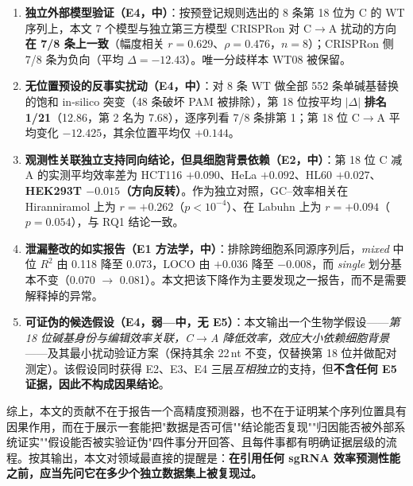\begin{enumerate}
\item \textbf{独立外部模型验证（E4，中）}：按预登记规则选出的 8 条第 18 位为 C 的 WT 序列上，本文 7 个模型与独立第三方模型 CRISPRon 对 C$\rightarrow$A 扰动的方向\textbf{在 7/8 条上一致}（幅度相关 $r=0.629$、$\rho=0.476$，$n=8$）；CRISPRon 侧 7/8 条为负向（平均 $\Delta=-12.43$）。唯一分歧样本 WT08 被保留。
\item \textbf{无位置预设的反事实扰动（E4，中）}：对 8 条 WT 做全部 552 条单碱基替换的饱和 in-silico 突变（48 条破坏 PAM 被排除），第 18 位按平均 $|\Delta|$ \textbf{排名 1/21}（12.86，第 2 名为 7.68），逐序列看 7/8 条排第 1；第 18 位 C$\rightarrow$A 平均变化 $-12.425$，其余位置平均仅 $+0.144$。
\item \textbf{观测性关联独立支持同向结论，但具细胞背景依赖（E2，中）}：第 18 位 C 减 A 的实测平均效率差为 HCT116 $+0.090$、HeLa $+0.092$、HL60 $+0.027$、\textbf{HEK293T $-0.015$（方向反转）}。作为独立对照，GC–效率相关在 Hiranniramol 上为 $r=+0.262$（$p<10^{-4}$）、在 Labuhn 上为 $r=+0.094$（$p=0.054$），与 RQ1 结论一致。
\item \textbf{泄漏整改的如实报告（E1 方法学，中）}：排除跨细胞系同源序列后，\emph{mixed} 中位 $R^{2}$ 由 0.118 降至 0.073，LOCO 由 $+0.036$ 降至 $-0.008$，而 \emph{single} 划分基本不变（0.070 $\rightarrow$ 0.081）。本文把该下降作为主要发现之一报告，而不是需要解释掉的异常。
\item \textbf{可证伪的候选假设（E4，弱—中，无 E5）}：本文输出一个生物学假设——\emph{第 18 位碱基身份与编辑效率关联，C$\rightarrow$A 降低效率，效应大小依赖细胞背景}——及其最小扰动验证方案（保持其余 22\,nt 不变，仅替换第 18 位并做配对测定）。该假设同时获得 E2、E3、E4 三层\emph{互相独立}的支持，但\textbf{不含任何 E5 证据，因此不构成因果结论}。
\end{enumerate}

综上，本文的贡献不在于报告一个高精度预测器，也不在于证明某个序列位置具有因果作用，而在于展示一套能把"数据是否可信""结论能否复现""归因能否被外部系统证实""假设能否被实验证伪"四件事分开回答、且每件事都有明确证据层级的流程。按其输出，本文对领域最直接的提醒是：\textbf{在引用任何 sgRNA 效率预测性能之前，应当先问它在多少个独立数据集上被复现过。}
